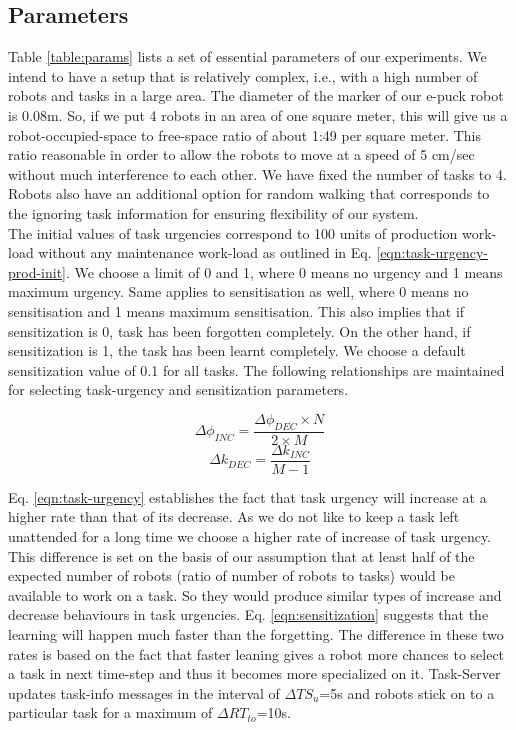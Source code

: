 \subsection{Parameters}
Table \ref{table:params} lists a set of essential parameters of our experiments. We intend to have a setup that is relatively complex, i.e., with a high number of robots and tasks in a large area. The diameter of the marker of our e-puck robot is 0.08m. So, if we put 4 robots in an area of one square meter, this will give us a robot-occupied-space to free-space ratio of about 1:49 per square meter. This ratio reasonable in order to allow the robots to move at a speed of 5 cm/sec  without much interference to each other. We have fixed the number of tasks to 4. Robots also have an additional option for random walking that corresponds to the ignoring task information for ensuring flexibility of our system.\\
The initial values of task urgencies correspond to 100 units of production work-load without any maintenance work-load as outlined in Eq. \ref{eqn:task-urgency-prod-init}. We choose a limit of 0 and 1, where 0 means no urgency and 1 means maximum urgency. Same applies to sensitisation as well, where 0 means no sensitisation and 1 means maximum sensitisation. This also implies that if sensitization is 0, task has been forgotten completely. On the other hand, if sensitization is 1, the task has been learnt completely. We choose a default sensitization value of 0.1 
for all tasks. The following relationships are maintained for selecting task-urgency and sensitization parameters.
\begin{small}
\begin{equation}
\Delta\phi_{INC} =  \frac{\Delta\phi_{DEC} \times N}{2 \times M}
\label{eqn:task-urgency}
\end{equation}
%
\begin{equation}
\Delta k_{DEC} = \frac{\Delta k_{INC}} {M - 1} 
\label{eqn:sensitization}
\end{equation}
\end{small}
%
Eq. \ref{eqn:task-urgency} establishes the fact that task urgency will increase at a higher rate than that of its decrease. As we do not like to keep a task left unattended for a long time we choose a higher rate of increase of task urgency. This difference is set on the basis of our assumption that at least half of the expected number of robots (ratio of number of robots to tasks) would be available to work on a task. So they would produce similar types of increase and decrease behaviours in task urgencies.
Eq. \ref{eqn:sensitization} suggests that the learning will happen much faster than the forgetting. The difference in these two rates is based on the fact that faster leaning gives a robot more chances to select  a task in next time-step and thus it becomes more specialized on it.  Task-Server updates task-info messages in the interval of $\Delta TS_u$=5s and robots stick on to a particular task for a maximum of  $\Delta RT_{to}$=10s.
